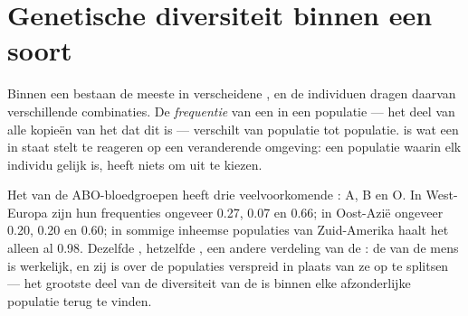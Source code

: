 \section{Genetische diversiteit binnen een soort}

\begin{proposition}\label{prop:g10:biodiversity-scales:genetic}
Binnen een  bestaan de meeste  in verscheidene , en de
individuen dragen daarvan verschillende combinaties. De
\emph{frequentie} van een  in een populatie --- het deel van alle
kopieën van het  dat dit  is --- verschilt van populatie tot
populatie.  is wat een  in staat stelt te
reageren op een veranderende omgeving: een populatie waarin elk individu
gelijk is, heeft niets om uit te kiezen.
\end{proposition}
\admitted

\begin{example}\label{ex:g10:biodiversity-scales:abo}
Het  van de ABO-bloedgroepen heeft drie veelvoorkomende : A, B
en O. In West-Europa zijn hun frequenties ongeveer 0.27, 0.07 en 0.66;
in Oost-Azië ongeveer 0.20, 0.20 en 0.60; in sommige inheemse populaties
van Zuid-Amerika haalt het  alleen al 0.98. Dezelfde ,
hetzelfde , een andere verdeling van de : de  van de mens is werkelijk, en zij is over de populaties
verspreid in plaats van ze op te splitsen --- het grootste deel van de
diversiteit van de  is binnen elke afzonderlijke populatie terug
te vinden.
\end{example}

